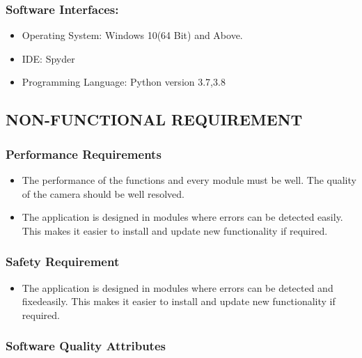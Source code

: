 \documentclass[12pt]{report}
\begin{document}
\subsubsection{ Software Interfaces:}
\normalsize\begin{itemize}\item    Operating System: Windows 10(64 Bit) and Above.

\item   IDE: Spyder
\item  Programming Language: Python version 3.7,3.8

\end{itemize}

\centering
\raggedright
\subsection{ NON-FUNCTIONAL REQUIREMENT}

\justifying
\setlength{\parindent}{4em}
\setlength{\parskip}{0.5em}
\renewcommand{\baselinestretch}{1.5}
\subsubsection{ Performance Requirements}
\normalsize\begin{itemize}\item  The performance of the functions and every module must be well. The quality of the 
camera should be well resolved.
\item  The application is designed in modules where errors can be detected easily. This makes 
it easier to install and update new functionality if required.
\end{itemize}
\subsubsection{ Safety Requirement}
\normalsize\begin{itemize}\item   The application is designed in modules where errors can be detected and fixedeasily.
This makes it easier to install and update new functionality if required.

\end{itemize}
\subsubsection{  Software Quality Attributes}
\end{document}
